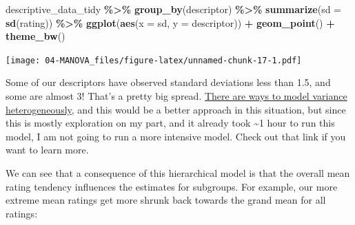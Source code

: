 \documentclass[
]{book}
\newenvironment{Shaded}{\begin{snugshade}}{\end{snugshade}}
\newcommand{\AttributeTok}[1]{\textcolor[rgb]{0.13,0.29,0.53}{#1}}
\newcommand{\FunctionTok}[1]{\textcolor[rgb]{0.13,0.29,0.53}{\textbf{#1}}}
\newcommand{\NormalTok}[1]{#1}
\newcommand{\SpecialCharTok}[1]{\textcolor[rgb]{0.81,0.36,0.00}{\textbf{#1}}}
\begin{document}
\begin{Shaded}
\begin{Highlighting}[]
\NormalTok{descriptive\_data\_tidy }\SpecialCharTok{\%\textgreater{}\%}
  \FunctionTok{group\_by}\NormalTok{(descriptor) }\SpecialCharTok{\%\textgreater{}\%}
  \FunctionTok{summarize}\NormalTok{(}\AttributeTok{sd =} \FunctionTok{sd}\NormalTok{(rating)) }\SpecialCharTok{\%\textgreater{}\%}
  \FunctionTok{ggplot}\NormalTok{(}\FunctionTok{aes}\NormalTok{(}\AttributeTok{x =}\NormalTok{ sd, }\AttributeTok{y =}\NormalTok{ descriptor)) }\SpecialCharTok{+} 
  \FunctionTok{geom\_point}\NormalTok{() }\SpecialCharTok{+} 
  \FunctionTok{theme\_bw}\NormalTok{()}
\end{Highlighting}
\end{Shaded}

\texttt{[image: 04-MANOVA\_files/figure-latex/unnamed-chunk-17-1.pdf]}

Some of our descriptors have observed standard deviations less than 1.5, and some are almost 3! That's a pretty big spread. \href{https://bookdown.org/content/3686/metric-predicted-variable-with-multiple-nominal-predictors.html\#heterogeneous-variances-and-robustness-against-outliers-1}{There are ways to model variance heterogeneously}, and this would be a better approach in this situation, but since this is mostly exploration on my part, and it already took \textasciitilde1 hour to run this model, I am not going to run a more intensive model. Check out that link if you want to learn more.

We can see that a consequence of this hierarchical model is that the overall mean rating tendency influences the estimates for subgroups. For example, our more extreme mean ratings get more shrunk back towards the grand mean for all ratings:
\end{document}
